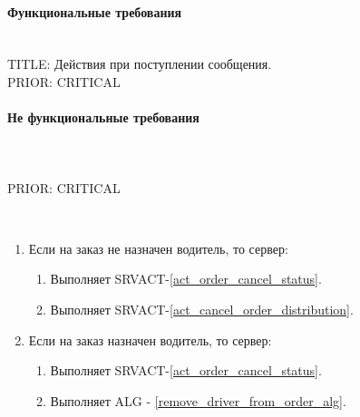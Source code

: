       \paragraph{Функциональные требования} \mbox{}\\

        TITLE: Действия при поступлении сообщения.
      	\\
      	PRIOR: CRITICAL\\

      \paragraph{Не функциональные требования} \mbox{}\\

      	\\
      	PRIOR: CRITICAL\\

    	\begin{alg}\label{cancel_order_alg} \mbox{}\\

    		\begin{enumerate}
    			\item Если на заказ не назначен водитель, то сервер:
    			\begin{enumerate}
    				\item Выполняет SRVACT-\ref{act_order_cancel_status}.
    				\item Выполняет SRVACT-\ref{act_cancel_order_distribution}.
    			\end{enumerate}
    			\item Если на заказ назначен водитель, то сервер:
    			\begin{enumerate}
    				\item Выполняет SRVACT-\ref{act_order_cancel_status}.
    				\item Выполняет ALG - \ref{remove_driver_from_order_alg}.
    			\end{enumerate}
    		\end{enumerate}

    	\end{alg}

